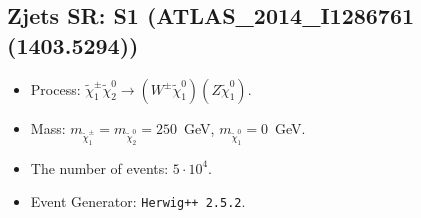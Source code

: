 \documentclass[12pt]{article}
\begin{document}
    
\subsection*{Zjets SR: S1 (ATLAS\_2014\_I1286761 (1403.5294))} 


        \begin{itemize}
        \item  Process: $\tilde \chi_1^\pm \tilde \chi_2^0 \to (W^\pm \tilde \chi_1^0) (Z \tilde \chi_1^0)$.
        \item  Mass: $m_{\tilde \chi_1^\pm} = m_{\tilde \chi_2^0} = 250$~GeV, $m_{\tilde \chi_1^0} = 0$~GeV.
        \item  The number of events: $5 \cdot 10^4$.
        \item  Event Generator: {\tt Herwig++ 2.5.2}.    
        \end{itemize}    
    
\end{document}
